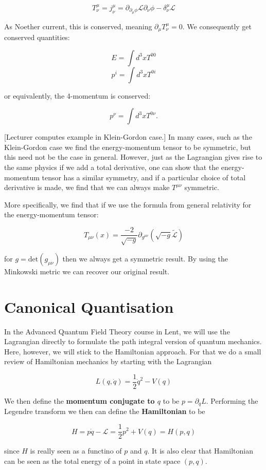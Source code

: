 \documentclass{article}
\theoremstyle{definition}
\begin{document}
$$ T^\mu_\nu = j^\mu_\nu = \partial_{\partial_\mu \phi} \mathcal{L} \partial_\nu
\phi - \delta^\mu_\nu \mathcal{L} $$

As Noether current, this is conserved, meaning $\partial_\mu T^\mu_\nu = 0$. We
consequently get conserved quantities:

$$ E = \int d^3x T^{00} $$
$$ p^i = \int d^3xT^{0i} $$

or equivalently, the 4-momentum is conserved:

$$ p^\nu = \int d^3x T^{0\nu}. $$

[Lecturer computes example in Klein-Gordon case.] In many cases, such as the
Klein-Gordon case we find the energy-momentum tensor to be symmetric, but this
need not be the case in general. However, just as the Lagrangian gives rise to
the same physics if we add a total derivative, one can show that the
energy-momentum tensor has a similar symmetry, and if a particular choice of
total derivative is made, we find that we can always make $T^{\mu \nu}$
symmetric.

More specifically, we find that if we use the formula from general relativity
for the energy-momentum tensor:

$$ T_{\mu\nu}(x) = \frac{-2}{\sqrt{-g}} \partial_{g^{\mu\nu}} (\sqrt{-g}
\tilde{\mathcal{L}}) $$

for $g = \text{det}(g_{\mu \nu})$ then we always get a symmetric result. By
using the Minkowski metric we can recover our original result.

\section{Canonical Quantisation}

In the Advanced Quantum Field Theory course in Lent, we will use the Lagrangian
directly to formulate the path integral version of quantum mechanics. Here,
however, we will stick to the Hamiltonian approach. For that we do a small
review of Hamiltonian mechanics by starting with the Lagrangian

$$ L(q, \dot{q}) = \frac{1}{2}\dot{q}^2 - V(q) $$

We then define the \textbf{momentum conjugate to $q$} to be $p =
\partial_{\dot{q}} L$. Performing the Legendre transform we then can define the
\textbf{Hamiltonian} to be

$$ H = p\dot{q} - \mathcal{L} = \frac{1}{2}p^2 + V(q) = H(p, q) $$

since $H$ is really seen as a functino of $p$ and $q$. It is also clear that
Hamiltonian can be seen as the total energy of a point in state space $(p, q)$.
\end{document}
